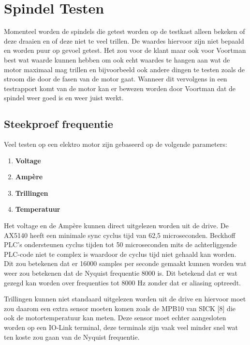 \section{Spindel Testen}

Momenteel worden de spindels die getest worden op de testkast alleen bekeken of deze draaien en of deze niet te veel trillen. De waardes hiervoor zijn niet bepaald en worden puur op gevoel getest. Het zou voor de klant maar ook voor Voortman best wat waarde kunnen hebben om ook echt waardes te hangen aan wat de motor maximaal mag trillen en bijvoorbeeld ook andere dingen te testen zoals de stroom die door de fasen van de motor gaat. Wanneer dit vervolgens in een testrapport komt van de motor kan er bewezen worden door Voortman dat de spindel weer goed is en weer juist werkt.

\subsection{Steekproef frequentie}

Veel testen op een elektro motor zijn gebaseerd op de volgende parameters:

\begin{enumerate}
	\item \textbf{Voltage}
	\item \textbf{Ampère}
	\item \textbf{Trillingen}
	\item \textbf{Temperatuur}
\end{enumerate}

Het voltage en de Ampère kunnen direct uitgelezen worden uit de drive. De \gls{AX5140} heeft een minimale sync cyclus tijd van 62,5 microseconden. Beckhoff \gls{PLC}’s ondersteunen cyclus tijden tot 50 microseconden mits de achterliggende \gls{PLC}-code niet te complex is waardoor de cyclus tijd niet gehaald kan worden. Dit zou betekenen dat er 16000 samples per seconde gemaakt kunnen worden wat weer zou betekenen dat de Nyquist frequentie 8000 is. Dit betekend dat er wat gezegd kan worden over frequenties tot 8000 Hz zonder dat er aliasing optreedt.

\vspace{0.5cm}

Trillingen kunnen niet standaard uitgelezen worden uit de drive en hiervoor moet zou daarom een extra sensor moeten komen zoals de MPB10 van SICK [8] die ook de motortemperatuur kan meten. Deze sensor moet echter aangesloten worden op een IO-Link terminal, deze terminals zijn vaak veel minder snel wat ten koste zou gaan van de Nyquist frequentie.

